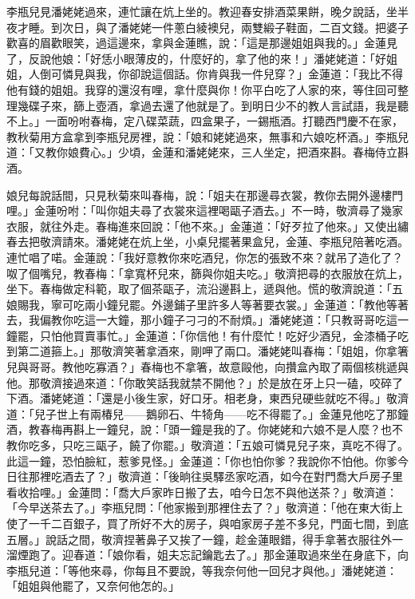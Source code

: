 李瓶兒見潘姥姥過來，連忙讓在炕上坐的。教迎春安排酒菜果餅，晚夕說話，坐半夜才睡。到次日，與了潘姥姥一件蔥白綾襖兒，兩雙緞子鞋面，二百文錢。把婆子歡喜的眉歡眼笑，過這邊來，拿與金蓮瞧，說：「這是那邊姐姐與我的。」金蓮見了，反說他娘：「好恁小眼薄皮的，什麼好的，拿了他的來！」潘姥姥道：「好姐姐，人倒可憐見與我，你卻說這個話。你肯與我一件兒穿？」金蓮道：「我比不得他有錢的姐姐。我穿的還沒有哩，拿什麼與你！你平白吃了人家的來，等住回可整理幾碟子來，篩上壺酒，拿過去還了他就是了。到明日少不的教人言試語，我是聽不上。」一面吩咐春梅，定八碟菜蔬，四盒果子，一錫瓶酒。打聽西門慶不在家，教秋菊用方盒拿到李瓶兒房裡，說：「娘和姥姥過來，無事和六娘吃杯酒。」李瓶兒道：「又教你娘費心。」少頃，金蓮和潘姥姥來，三人坐定，把酒來斟。春梅侍立斟酒。

娘兒每說話間，只見秋菊來叫春梅，說：「姐夫在那邊尋衣裳，教你去開外邊樓門哩。」金蓮吩咐：「叫你姐夫尋了衣裳來這裡喝甌子酒去。」不一時，敬濟尋了幾家衣服，就往外走。春梅進來回說：「他不來。」金蓮道：「好歹拉了他來。」又使出繡春去把敬濟請來。潘姥姥在炕上坐，小桌兒擺著果盒兒，金蓮、李瓶兒陪著吃酒。連忙唱了喏。金蓮說：「我好意教你來吃酒兒，你怎的張致不來？就吊了造化了？呶了個嘴兒，教春梅：「拿寬杯兒來，篩與你姐夫吃。」敬濟把尋的衣服放在炕上，坐下。春梅做定科範，取了個茶甌子，流沿邊斟上，遞與他。慌的敬濟說道：「五娘賜我，寧可吃兩小鐘兒罷。外邊鋪子里許多人等著要衣裳。」金蓮道：「教他等著去，我偏教你吃這一大鐘，那小鐘子刁刁的不耐煩。」潘姥姥道：「只教哥哥吃這一鐘罷，只怕他買賣事忙。」金蓮道：「你信他！有什麼忙！吃好少酒兒，金漆桶子吃到第二道箍上。」那敬濟笑著拿酒來，剛呷了兩口。潘姥姥叫春梅：「姐姐，你拿箸兒與哥哥。教他吃寡酒？」春梅也不拿箸，故意毆他，向攢盒內取了兩個核桃遞與他。那敬濟接過來道：「你敢笑話我就禁不開他？」於是放在牙上只一磕，咬碎了下酒。潘姥姥道：「還是小後生家，好口牙。相老身，東西兒硬些就吃不得。」敬濟道：「兒子世上有兩椿兒——鵝卵石、牛犄角——吃不得罷了。」金蓮見他吃了那鐘酒，教春梅再斟上一鐘兒，說：「頭一鐘是我的了。你姥姥和六娘不是人麼？也不教你吃多，只吃三甌子，饒了你罷。」敬濟道：「五娘可憐見兒子來，真吃不得了。此這一鐘，恐怕臉紅，惹爹見怪。」金蓮道：「你也怕你爹？我說你不怕他。你爹今日往那裡吃酒去了？」敬濟道：「後晌往吳驛丞家吃酒，如今在對門喬大戶房子里看收拾哩。」金蓮問：「喬大戶家昨日搬了去，咱今日怎不與他送茶？」敬濟道：「今早送茶去了。」李瓶兒問：「他家搬到那裡住去了？」敬濟道：「他在東大街上使了一千二百銀子，買了所好不大的房子，與咱家房子差不多兒，門面七間，到底五層。」說話之間，敬濟捏著鼻子又挨了一鐘，趁金蓮眼錯，得手拿著衣服往外一溜煙跑了。迎春道：「娘你看，姐夫忘記鑰匙去了。」那金蓮取過來坐在身底下，向李瓶兒道：「等他來尋，你每且不要說，等我奈何他一回兒才與他。」潘姥姥道：「姐姐與他罷了，又奈何他怎的。」

